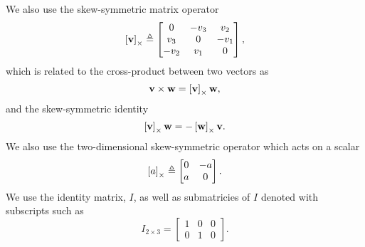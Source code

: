 We also use the skew-symmetric matrix operator
\begin{equation}
  \left[ \boldsymbol{\mathrm{v}} \right]_{\times} \triangleq
  \begin{bmatrix}
  0 & -v_{3} & v_{2}\\
  v_{3} & 0 & -v_{1}\\
  -v_{2} & v_{1} & 0
  \end{bmatrix},
\end{equation}
which is related to the cross-product between two vectors as
\begin{equation}
  \boldsymbol{\mathrm{v}}\times\boldsymbol{\mathrm{w}}=\left[ \boldsymbol{\mathrm{v}} \right]_{\times}\boldsymbol{\mathrm{w}},
\end{equation}
and the skew-symmetric identity
\begin{equation}
  \left[ \boldsymbol{\mathrm{v}} \right]_{\times} \boldsymbol{\mathrm{w}} = -\left[ \boldsymbol{\mathrm{w}} \right]_{\times} \boldsymbol{\mathrm{v}}.
\end{equation}
We also use the two-dimensional skew-symmetric operator which acts on a scalar
\begin{equation}
  \left[ a \right]_{\times} \triangleq
  \begin{bmatrix}
  0 & -a \\
  a & 0
  \end{bmatrix}.
\end{equation}
We use the identity matrix, $I$, as well as submatricies of $I$ denoted with
subscripts such as
\begin{equation}
  I_{2 \times 3} =
  \begin{bmatrix}
    1 & 0 & 0 \\
    0 & 1 & 0
  \end{bmatrix}.
\end{equation}
